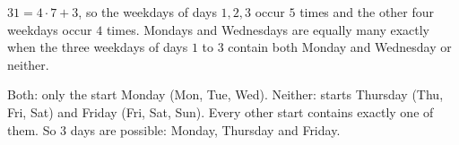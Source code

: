 $31=4\cdot7+3$, so the weekdays of days $1,2,3$ occur $5$ times and the other four weekdays occur $4$ times. Mondays and Wednesdays are equally many exactly when the three weekdays of days $1$ to $3$ contain both Monday and Wednesday or neither.

Both: only the start Monday (Mon, Tue, Wed). Neither: starts Thursday (Thu, Fri, Sat) and Friday (Fri, Sat, Sun). Every other start contains exactly one of them. So $\boxed{3}$ days are possible: Monday, Thursday and Friday.
